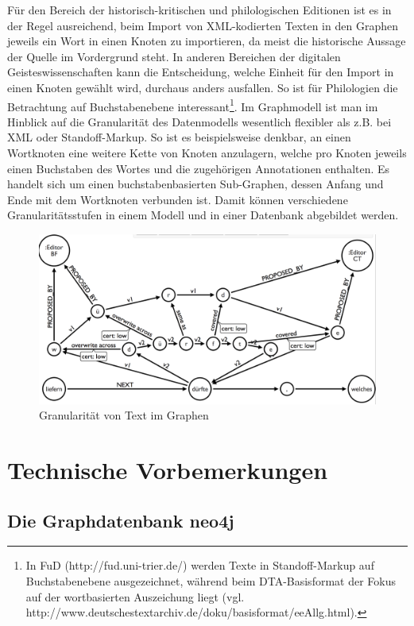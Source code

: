 \documentclass[ngerman,]{scrreprt}
\begin{document}
Für den Bereich der historisch-kritischen und philologischen Editionen ist es in der Regel ausreichend, beim Import von XML-kodierten Texten in den Graphen jeweils ein Wort in einen Knoten zu importieren, da meist die historische Aussage der Quelle im Vordergrund steht. In anderen Bereichen der digitalen Geisteswissenschaften kann die Entscheidung, welche Einheit für den Import in einen Knoten gewählt wird, durchaus anders ausfallen. So ist für Philologien die Betrachtung auf Buchstabenebene interessant\footnote{In FuD (http://fud.uni-trier.de/) werden Texte in Standoff-Markup auf Buchstabenebene ausgezeichnet, während beim DTA-Basisformat der Fokus auf der wortbasierten Auszeichung liegt (vgl. http://www.deutschestextarchiv.de/doku/basisformat/eeAllg.html).}. Im Graphmodell ist man im Hinblick auf die Granularität des Datenmodells wesentlich flexibler als z.B. bei XML oder Standoff-Markup. So ist es beispielsweise denkbar, an einen Wortknoten eine weitere Kette von Knoten anzulagern, welche pro Knoten jeweils einen Buchstaben des Wortes und die zugehörigen Annotationen enthalten. Es handelt sich um einen buchstabenbasierten Sub-Graphen, dessen Anfang und Ende mit dem Wortknoten verbunden ist. Damit können verschiedene Granularitätsstufen in einem Modell und in einer Datenbank abgebildet werden.

\begin{figure}
\centering
\includegraphics{Bilder/Granularitaet-im-Graphen.png}
\caption{Granularität von Text im Graphen}
\end{figure}

\section{Technische Vorbemerkungen}\label{technische-vorbemerkungen}

\subsection{Die Graphdatenbank neo4j}\label{die-graphdatenbank-neo4j}
\end{document}
